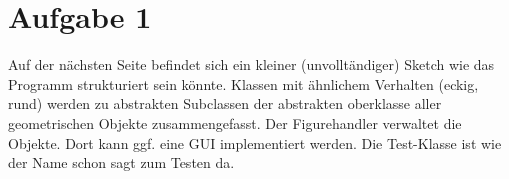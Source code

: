 
\usepackage{svg}

\newcommand{\dozent}{Prof. Dr. Claudia Müller-Birn, Barry Linnert}					%
\newcommand{\tutor}{Thierry Meurers}						%
\newcommand{\tutoriumNo}{10}				%
\newcommand{\ubungNo}{10}									%
\newcommand{\veranstaltung}{Objektorientierte Programmierung}	%
\newcommand{\semester}{SoSe 17}						%
\newcommand{\studenten}{Stefaan Hessmann, Jaap Pedersen, Mark Niehues}			%




\section{Aufgabe 1}
Auf der nächsten Seite befindet sich ein kleiner (unvolltändiger) Sketch wie das Programm strukturiert sein könnte. Klassen mit ähnlichem Verhalten (eckig, rund) werden zu abstrakten Subclassen der abstrakten oberklasse aller geometrischen Objekte zusammengefasst. Der Figurehandler verwaltet die Objekte. Dort kann ggf. eine GUI implementiert werden. Die Test-Klasse ist wie der Name schon sagt zum Testen da.
\begin{figure}[htbp]
    \centering
    \def\svgwidth{\columnwidth}
    
\end{figure}



